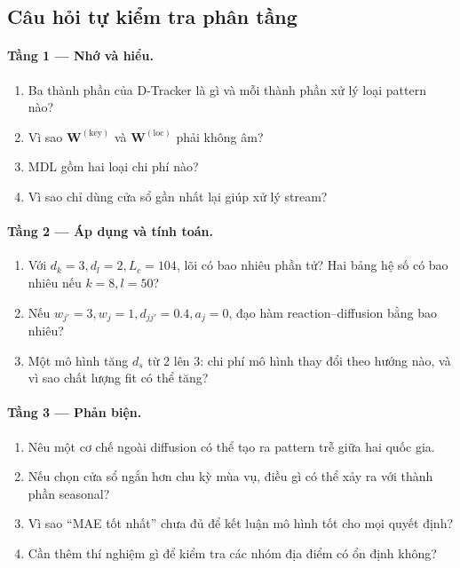 \subsection*{Câu hỏi tự kiểm tra phân tầng}

\paragraph{Tầng 1 --- Nhớ và hiểu.}
\begin{enumerate}
  \item Ba thành phần của D-Tracker là gì và mỗi thành phần xử lý loại pattern nào?
  \item Vì sao $\mathbf{W}^{(\mathrm{key})}$ và $\mathbf{W}^{(\mathrm{loc})}$ phải không âm?
  \item MDL gồm hai loại chi phí nào?
  \item Vì sao chỉ dùng cửa sổ gần nhất lại giúp xử lý stream?
\end{enumerate}

\paragraph{Tầng 2 --- Áp dụng và tính toán.}
\begin{enumerate}
  \item Với $d_k=3,d_l=2,L_c=104$, lõi có bao nhiêu phần tử? Hai bảng hệ số có bao nhiêu nếu
        $k=8,l=50$?
  \item Nếu $w_{j'}=3,w_j=1,d_{jj'}=0.4,a_j=0$, đạo hàm reaction--diffusion bằng bao nhiêu?
  \item Một mô hình tăng $d_s$ từ 2 lên 3: chi phí mô hình thay đổi theo hướng nào, và vì sao
        chất lượng fit có thể tăng?
\end{enumerate}

\paragraph{Tầng 3 --- Phản biện.}
\begin{enumerate}
  \item Nêu một cơ chế ngoài diffusion có thể tạo ra pattern trễ giữa hai quốc gia.
  \item Nếu chọn cửa sổ ngắn hơn chu kỳ mùa vụ, điều gì có thể xảy ra với thành phần seasonal?
  \item Vì sao ``MAE tốt nhất'' chưa đủ để kết luận mô hình tốt cho mọi quyết định?
  \item Cần thêm thí nghiệm gì để kiểm tra các nhóm địa điểm có ổn định không?
\end{enumerate}

